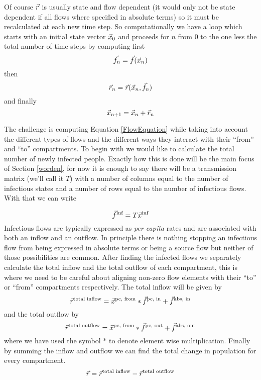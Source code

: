 Of course $\vec{r}$ is usually state and flow dependent (it would only not be state dependent if all flows where specified in absolute terms) so it must be recalculated at each new time step. So computationally we have a loop which starts with an initial state vector $\vec{x}_0$ and proceeds for $n$ from 0 to the one less the total number of time steps by computing first
\[
    \vec{f}_n = \vec{f}(\vec{x}_n)
\]
then
\begin{equation}\label{FlowEquation}
    \vec{r}_n = \vec{r}(\vec{x}_n, \vec{f}_n)
\end{equation}
and finally
\[
    \vec{x}_{n+1} = \vec{x}_n + \vec{r}_n
\]

The challenge is computing Equation \ref{FlowEquation} while taking into account the different types of flows and the different ways they interact with their ``from'' and ``to'' compartments. To begin with we would like to calculate the total number of newly infected people. Exactly how this is done will be the main focus of Section \ref{worden}, for now it is enough to say there will be a transmission matrix (we'll call it $T$) with a number of columns equal to the number of infectious states and a number of rows equal to the number of infectious flows. With that we can write
    
\begin{equation}\label{infectionequation}
\vec{f}^\text{inf} = T\vec{x}^\text{inf}
\end{equation}
Infectious flows are typically expressed as \emph{per capita} rates and are associated with both an inflow and an outflow. In principle there is nothing stopping an infectious flow from being expressed in absolute terms or being a source flow but neither of those possibilities are common. After finding the infected flows we separately calculate the total inflow and the total outflow of each compartment, this is where we need to be careful about aligning non-zero flow elements with their ``to'' or ``from'' compartments respectively. The total inflow will be given by
\[
    \vec{r}^\text{total inflow} = \vec{x}^\text{pc, from} * \vec{f}^\text{pc, in} + \vec{f}^\text{abs, in}
\]
and the total outflow by     
\[
    \vec{r}^\text{total outflow} = \vec{x}^\text{pc, from} * \vec{f}^\text{pc, out} + \vec{f}^\text{abs, out}
\]
where we have used the symbol $*$ to denote element wise multiplication. Finally by summing the inflow and outflow we can find the total change in population for every compartment.
\[
\vec{r} = \vec{r}^\text{total inflow} - \vec{r}^\text{total outflow}
\]     

